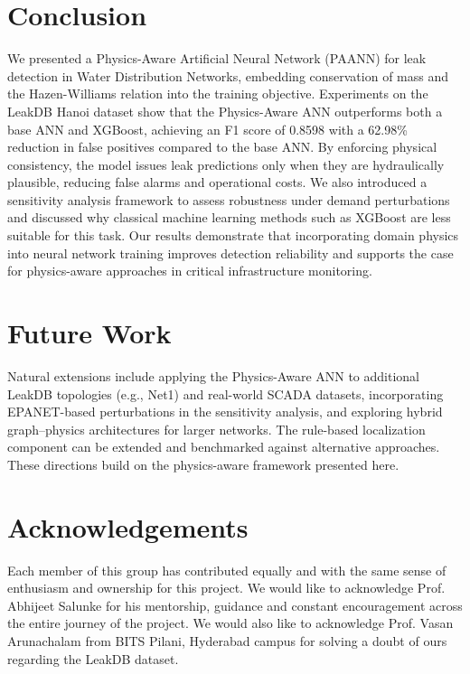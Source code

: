 \documentclass[final,5p,times,twocolumn,authoryear]{elsarticle}
\begin{document}
\section{Conclusion}

We presented a Physics-Aware Artificial Neural Network (PAANN) for leak detection in Water Distribution Networks, embedding conservation of mass and the Hazen-Williams relation into the training objective. Experiments on the LeakDB Hanoi dataset show that the Physics-Aware ANN outperforms both a base ANN and XGBoost, achieving an F1 score of 0.8598 with a 62.98\% reduction in false positives compared to the base ANN. By enforcing physical consistency, the model issues leak predictions only when they are hydraulically plausible, reducing false alarms and operational costs. We also introduced a sensitivity analysis framework to assess robustness under demand perturbations and discussed why classical machine learning methods such as XGBoost are less suitable for this task. Our results demonstrate that incorporating domain physics into neural network training improves detection reliability and supports the case for physics-aware approaches in critical infrastructure monitoring.

\section{Future Work}

Natural extensions include applying the Physics-Aware ANN to additional LeakDB topologies (e.g., Net1) and real-world SCADA datasets, incorporating EPANET-based perturbations in the sensitivity analysis, and exploring hybrid graph–physics architectures for larger networks. The rule-based localization component can be extended and benchmarked against alternative approaches. These directions build on the physics-aware framework presented here.

\section{Acknowledgements}
Each member of this group has contributed equally and with the same sense of enthusiasm and ownership for this project.
\newline We would like to acknowledge Prof. Abhijeet Salunke for his mentorship, guidance and constant encouragement across the entire journey of the project.
\newline We would also like to acknowledge Prof. Vasan Arunachalam from BITS Pilani, Hyderabad campus for solving a doubt of ours regarding the LeakDB dataset. 
\end{document}

